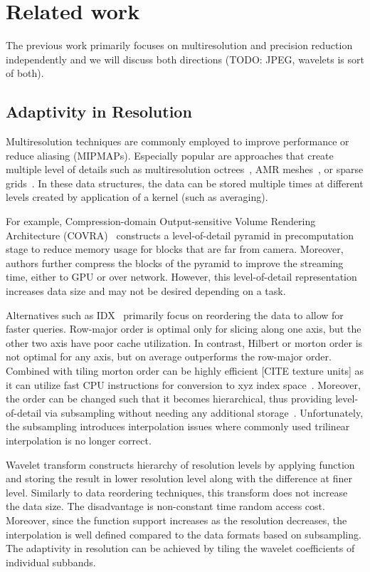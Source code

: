 \section{Related work}

The previous work primarily focuses on multiresolution and precision
reduction independently and we will discuss both directions
(TODO: JPEG, wavelets is sort of both).


\subsection{Adaptivity in Resolution}
Multiresolution techniques are commonly employed to improve performance or
reduce aliasing (MIPMAPs). Especially popular are approaches that create
multiple level of details such as multiresolution octrees~\cite{multires_octree1999},
AMR meshes~\cite{amr1989}, or sparse grids~\cite{vdb2013, spgrid2014}. In these data structures,
the data can be stored multiple times at different levels created by application of a kernel
(such as averaging). 

For example, Compression-domain Output-sensitive Volume Rendering Architecture (COVRA)~\cite{covra2012}
constructs a level-of-detail pyramid in precomputation stage to reduce memory usage for blocks that
are far from camera. Moreover, authors further compress the blocks of the pyramid to improve the
streaming time, either to GPU or over network. However, this level-of-detail representation increases data size
and may not be desired depending on a task.

Alternatives such as IDX~\cite{idx2001} primarily focus on reordering the data to allow
for faster queries. Row-major order is optimal only for slicing
along one axis, but the other two axis have poor cache utilization. In contrast, Hilbert
or morton order is not optimal for any axis, but on average outperforms the row-major
order. Combined with tiling morton order can be highly efficient [CITE texture units] as
it can utilize fast CPU instructions for conversion to xyz index space~\cite{spgrid2014}.
Moreover, the order can be changed such that it becomes hierarchical, thus providing
level-of-detail via subsampling without needing any additional storage~\cite{idx2001}. Unfortunately,
the subsampling introduces interpolation issues where commonly used trilinear interpolation
is no longer correct.

Wavelet transform constructs hierarchy of resolution levels by applying function and storing
the result in lower resolution level along with the difference at finer level. Similarly to
data reordering techniques, this transform does not increase the data size. The disadvantage is non-constant
time random access cost. Moreover, since
the function support increases as the resolution decreases, the interpolation is well defined
compared to the data formats based on subsampling. The adaptivity in resolution can be achieved
by tiling the wavelet coefficients of individual subbands. 

